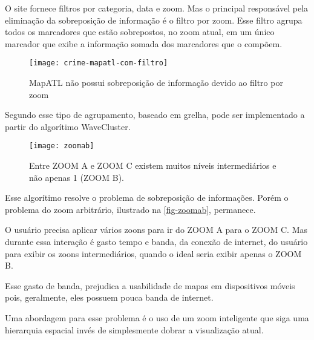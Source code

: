 O site fornece filtros por categoria, data e zoom. Mas o principal responsável pela eliminação da sobreposição de informação é o filtro por zoom. Esse filtro agrupa todos os marcadores que estão sobrepostos, no zoom atual, em um único marcador que exibe a informação somada dos marcadores que o compõem.
 
\begin{figure}[htb]
	\caption{\label{fig-mapatl} MapATL não possui sobreposição de informação devido ao filtro por zoom}
	\begin{center}
	    \texttt{[image: crime-mapatl-com-filtro]}
	\end{center}
\end{figure}

Segundo \cite[42,44]{silva2010solap+} esse tipo de agrupamento, baseado em grelha, pode ser implementado a partir do algorítimo WaveCluster\cite{wavecluster}. 

 

\begin{figure}[htb]
	\caption{\label{fig-zoomab} Entre ZOOM A e ZOOM C existem muitos níveis intermediários e não apenas 1 (ZOOM B).}
	\begin{center}
	    \texttt{[image: zoomab]}
	\end{center}
\end{figure}

Esse algorítimo resolve o problema de sobreposição de informações. Porém o problema do zoom arbitrário, ilustrado na \autoref{fig-zoomab}, permanece.

O usuário precisa aplicar vários zoons para ir do ZOOM A para o ZOOM C. Mas durante essa interação é gasto tempo e banda, da conexão de internet, do usuário para exibir os zoons intermediários, quando o ideal seria exibir apenas o ZOOM B.

Esse gasto de banda, prejudica a usabilidade de mapas em dispositivos móveis pois, geralmente, eles possuem pouca banda de internet.

Uma abordagem para esse problema é o uso de um zoom inteligente que siga uma hierarquia espacial invés de simplesmente dobrar a visualização atual. 

